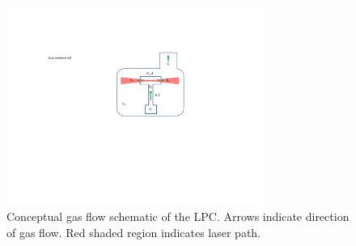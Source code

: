 \begin{figure}
	\centering
	\includegraphics[width=0.75\textwidth]{figures/chap3/LPC_schematic.pdf}
	\caption{Conceptual gas flow schematic of the LPC. Arrows indicate direction of gas flow. Red shaded region indicates laser path.}
	\label{fig:LPC_schematic}
\end{figure}



